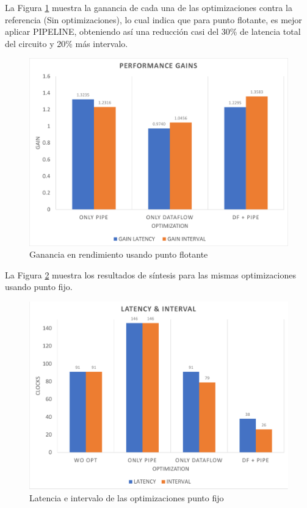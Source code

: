 La Figura \ref{fig:perfGainFloat} muestra la ganancia de cada una de las optimizaciones contra la referencia (Sin optimizaciones), lo cual indica que para punto flotante, es mejor aplicar PIPELINE, obteniendo así una  reducción casi del 30\% de latencia total del circuito y 20\% más intervalo.


\begin{figure}[!ht]
	\centering
		\includegraphics[scale=0.45]{Figures/PERFGAINFLOAT}
	\caption{Ganancia en rendimiento usando punto flotante}
	\label{fig:perfGainFloat}
\end{figure}

La Figura \ref{fig:latIntFix} muestra los resultados de síntesis para las mismas optimizaciones usando punto fijo.

\begin{figure}[!ht]
	\centering
		\includegraphics[scale=0.45]{Figures/LATINTFIX}
	\caption{Latencia e intervalo de las optimizaciones punto fijo}
	\label{fig:latIntFix}
\end{figure}

